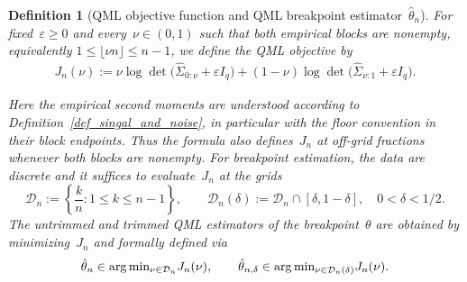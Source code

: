 \documentclass[10pt, letterpaper]{amsart}
\newtheorem{defn}[theorem]{Definition}
\def\min{{\rm min}}
\begin{document}
\begin{defn}[QML objective function and QML breakpoint estimator~$\hat \theta_n$]\label{def:qml_objective_function}
For fixed~$\varepsilon \geq 0$ and every~$\nu\in(0,1)$ such that both empirical blocks are nonempty, equivalently
$1\leq\lfloor \nu n\rfloor\leq n-1$, we define the QML objective by
\begin{align}
  J_{n}(\nu)
  := \nu \log\det\big(  \widehat \Sigma_{0: \nu } + \varepsilon I_q  \big)
   + (1- \nu) \log\det\big( \widehat \Sigma_{\nu : 1} + \varepsilon I_q\big).
\end{align}

Here the empirical second moments are understood according to Definition~\ref{def_singal_and_noise}, in particular with the floor convention in their block endpoints. Thus the formula also defines~$J_n$ at off-grid fractions whenever both blocks are nonempty. For breakpoint estimation, the data are discrete and it suffices to evaluate~$J_n$ at the grids
\[
    \mathcal D_n:=\left\{\frac{k}{n}:1\leq k\leq n-1\right\},
    \qquad
    \mathcal D_n(\delta):=\mathcal D_n\cap[\delta,1-\delta],
    \quad 0<\delta<1/2 .
\]
The untrimmed and trimmed QML estimators of the breakpoint~$\theta$ are obtained by minimizing~$J_n$ and formally defined via
\[
    \hat \theta_n\in\arg\min_{\nu\in\mathcal D_n}J_n(\nu),
    \qquad
    \hat \theta_{n,\delta}\in\arg\min_{\nu\in\mathcal D_n(\delta)}J_n(\nu).
\]

\end{defn}
\end{document}
